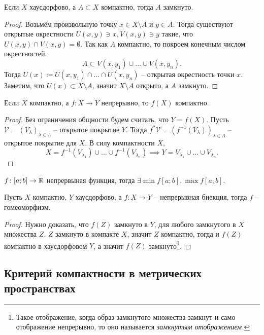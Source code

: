 \date{29 января 2025}
\begin{theorem}
    Если $X$ хаусдорфово, а $A \subset X$ компактно, тогда $A$ замкнуто.
\end{theorem}
\begin{proof}
    Возьмём произвольную точку $x \in X\setminus A$ и $y\in A.$ Тогда существуют открытые окрестности $U(x,y)\ni x, V(x,y) \ni y$ такие, что $U(x,y) \cap V(x,y) = \emptyset.$ Так как $A$ компактно, то покроем конечным числом окрестностей. \[A \subset V(x, y_1) \cup \ldots \cup V(x,y_n).\] Тогда $U(x) \coloneq U(x,y_1) \cap \ldots \cap U(x, y_n)$ -- открытая окрестность точки $x$. Заметим, что $U(x) \subset X\setminus A$, значит $X \setminus A$ открыто, а $A$ замкнуто.
\end{proof}
\begin{theorem}
    Если $X$ компактно, а $f\colon X \to Y$ непрерывно, то $f(X)$ компактно.
\end{theorem}

\begin{proof}
    Без ограничения общности будем считать, что $Y = f(X)$. Пусть $\mathcal V = (V_\lambda)_{\lambda\in \Lambda}$ -- открытое покрытие $Y$. Тогда $f^* \mathcal V = (f^{-1}(V_{\lambda}))_{\lambda \in \Lambda}$ -- открытое покрытие для $X$. В силу компактности $X$, \[X = f^{-1}(V_{\lambda_1})\cup \ldots\cup f^{-1}(V_{\lambda_n}) \implies Y = V_{\lambda_1} \cup\ldots\cup V_{\lambda_n}.\]
\end{proof}

\begin{corollary}
     $f\colon [a;b]\to\mathbb R$ непрервыная функция, тогда $\exists \min f[a;b], \max f[a;b].$
\end{corollary}

\begin{theorem}
    Пусть $X$ компактно, $Y$ хаусдорфово, а $f\colon X \to Y$ -- непрерывная биекция, тогда $f$ -- гомеоморфизм.
\end{theorem}
\begin{proof}
    Нужно доказать, что $f(Z)$ замкнуто в $Y$, для любого замкнутого в $X$ множества $Z$. $Z$ замкнуто в компакте $X$, значит $Z$ компактно, тогда и $f(Z)$ компактно в хаусдорфовом $Y$, а значит $f(Z)$ замкнуто\footnote{Такое отображение, когда образ замкнутого множества замкнут и само отображение непрерывно, то оно называется \emph{замкнутым отображением.}}.
\end{proof}
\subsection{Критерий компактности в метрических пространствах}

